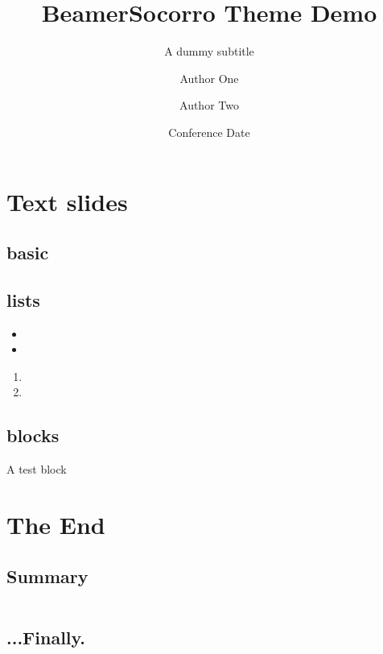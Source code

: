\documentclass[11pt]{beamer}
\title[Short Title]{BeamerSocorro Theme Demo}
\subtitle{A dummy subtitle}
\author[1,*]{Author One}
\author[2,**]{Author Two}
\affil[1]{Place One}
\affil[2]{Place Two}
\date{Conference Date}
\begin{document}
\titleslide
{}

\section{Text slides}
\subsection{basic}
\begin{frame}{\secname}
    \lipsum[1][1-6]   
    \lipsum[1][1] 
\end{frame}

\subsection{lists}
\begin{frame}{\secname}
    \begin{itemize}
        \item \lipsum[1][1]   
        \item \lipsum[1][2]
    \end{itemize}
    \begin{enumerate}
        \item \lipsum[1][1]   
        \item \lipsum[1][2]
    \end{enumerate}
\end{frame}

\subsection{blocks}
\begin{frame}{\secname}
    \begin{block}{A test block}
        \lipsum[1][1] 
    \end{block}
\end{frame}

\section{The End}
\subsection{Summary}
\begin{frame}{\secname}
    \begin{columns}[t]
        \begin{column}{.5\textwidth}
            \lipsum[1][1-3]   
        \end{column}
        \begin{column}{.5\textwidth}
            \lipsum[1][3-6] 
        \end{column}
    \end{columns}
\end{frame}
\subsection*{...Finally.}
\end{document}
